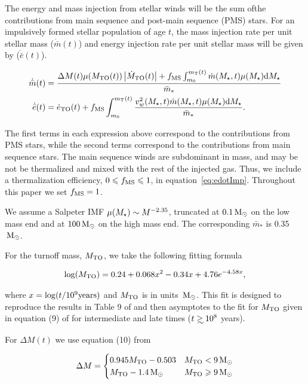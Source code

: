 The energy and mass injection from stellar winds will be the sum ofthe
contributions from main sequence and post-main sequence (PMS) stars.
For an impulsively formed stellar population of age $t$, the mass
injection rate per unit stellar mass ($\dot{\bar{m}}(t)$) and energy
injection rate per unit stellar mass will be given by
($\dot{\bar{e}}(t)$).

\begin{align} 
  \dot{\bar{m}}(t) &= \frac{\Delta M(t) \mu(M_{\rm TO}(t))
    \left|\dot{M}_{\rm TO}(t)\right| + f_{\rm MS} \int_{m_0}^{m_{\rm
        T}(t)}
    \dot{m}(\Mstar, t) \mu(\Mstar) {\rm d}\Mstar }{\bar{m}_*}\\
  \dot{\bar{e}}(t) &=\dot{e}_{\rm TO}(t)+ f_{\rm MS} \int_{m_0}^{m_{\rm T}(t)}
  \frac{\vw^2(\Mstar, t) \dot{m}(\Mstar, t) \mu(\Mstar) {\rm d}\Mstar}{\bar{m}_*}.
  \label{eq:edotImp}
\end{align} 

The first terms in each expression above correspond to the
contributions from PMS stars, while the second terms correspond to the
contributions from main sequence stars. The main sequence winds are
subdominant in mass, and may be not be thermalized and
mixed with the rest of the injected gas. Thus, we include a
thermalization efficiency, $ 0\le f_{\rm MS}\le 1$, in
equation~\eqref{eq:edotImp}. Throughout this paper we set $f_{\rm
  MS}=1$. 

We assume a Salpeter IMF $\mu(\Mstar)\sim M^{-2.35}$, truncated at $0.1
\Msun$ on the low mass end and at $100 \Msun$ on the high mass
end. The corresponding $\bar{m}_*$ is 0.35 $\Msun$.

For the turnoff mass, $M_{\rm TO}$, we take the following fitting
formula 

\begin{align}
\log(M_{\rm TO})=0.24 + 0.068 x^2-0.34 x+4.76 e^{-4.58 x},
\end{align}

where $x=\log(t/10^9 {\rm years})$ and $M_{\rm TO}$ is in units
$\Msun$. This fit is designed to reproduce the results in 
Table 9 of \citet{MaederMeynet:1987a} and then asymptotes to the fit
for $M_{\rm TO}$ given in equation (9) of \citet{CiottiOstriker:2007a}
for intermediate and late times ($t \gsim 10^8$ years).

For $\Delta M(t)$ we use equation (10) from \citet{CiottiOstriker:2007a}

\begin{align}
\Delta M=
\begin{cases}
0.945 M_{\rm TO}-0.503 & M_{\rm TO} < 9 \Msun\\
 M_{\rm TO}-1.4 \Msun &  M_{\rm TO} \ge 9 \Msun
\end{cases}
\end{align}

